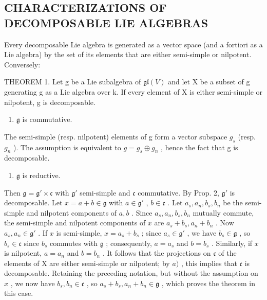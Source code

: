 \subsection{CHARACTERIZATIONS OF DECOMPOSABLE LIE ALGEBRAS}

Every decomposable Lie algebra is generated as a vector space (and a fortiori as a Lie algebra) by the set of its elements that are either semi-simple or nilpotent. Conversely:

THEOREM 1. Let g be a Lie subalgebra of \(\mathfrak{gl}(V)\) and let X be a subset of g generating g as a Lie algebra over k. If every element of X is either semi-simple or nilpotent, g is decomposable.

\begin{enumerate}
\def\labelenumi{\alph{enumi})}
\tightlist
\item
  \(\mathfrak{g}\) is commutative.
\end{enumerate}

The semi-simple (resp. nilpotent) elements of g form a vector subspace \(g_{s}\) (resp. \(g_{n}\) ). The assumption is equivalent to \(g = g_{s} \oplus g_{n}\) , hence the fact that g is decomposable.

\begin{enumerate}
\def\labelenumi{\alph{enumi})}
\setcounter{enumi}{1}
\tightlist
\item
  \(\mathfrak{g}\) is reductive.
\end{enumerate}

Then \(\mathfrak{g} = \mathfrak{g}' \times \mathfrak{c}\) with \(\mathfrak{g}'\) semi-simple and \(\mathfrak{c}\) commutative. By Prop. 2, \(\mathfrak{g}'\) is decomposable. Let \(x = a + b \in \mathfrak{g}\) with \(a \in \mathfrak{g}'\) , \(b \in \mathfrak{c}\) . Let \(a_s, a_n, b_s, b_n\) be the semi-simple and nilpotent components of \(a, b\) . Since \(a_s, a_n, b_s, b_n\) mutually commute, the semi-simple and nilpotent components of \(x\) are \(a_s + b_s, a_n + b_n\) . Now \(a_s, a_n \in \mathfrak{g}'\) . If \(x\) is semi-simple, \(x = a_s + b_s\) ; since \(a_s \in \mathfrak{g}'\) , we have \(b_s \in \mathfrak{g}\) , so \(b_s \in \mathfrak{c}\) since \(b_s\) commutes with \(\mathfrak{g}\) ; consequently, \(a = a_s\) and \(b = b_s\) . Similarly, if \(x\) is nilpotent, \(a = a_n\) and \(b = b_n\) . It follows that the projections on \(\mathfrak{c}\) of the elements of X are either semi-simple or nilpotent; by \(a)\) , this implies that \(\mathfrak{c}\) is decomposable. Retaining the preceding notation, but without the assumption on \(x\) , we now have \(b_s, b_n \in \mathfrak{c}\) , so \(a_s + b_s, a_n + b_n \in \mathfrak{g}\) , which proves the theorem in this case.

